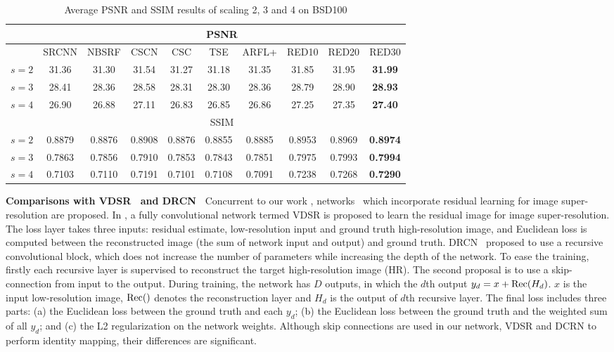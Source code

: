\begin{table*}[htb!]
\centering
%
\caption{Average PSNR and SSIM results of scaling 2, 3 and 4 on BSD100}
\begin{tabular}{c|c c c c c c c c c}  \hline
              &\multicolumn{9}{c}{PSNR}            \\ \hline
           &SRCNN  &NBSRF  &CSCN   &CSC    &TSE    &ARFL+  &RED10  &RED20   &RED30           \\ \hline
  $s = 2$  &31.36  &31.30  &31.54  &31.27  &31.18  &31.35  &31.85  &31.95   &\textbf{31.99}  \\ \hline
  $s = 3$  &28.41  &28.36  &28.58  &28.31  &28.30  &28.36  &28.79  &28.90   &\textbf{28.93}  \\ \hline
  $s = 4$  &26.90  &26.88  &27.11  &26.83  &26.85  &26.86  &27.25  &27.35   &\textbf{27.40}  \\ \hline
              &\multicolumn{9}{c}{SSIM}            \\ \hline
  $s = 2$  &0.8879 &0.8876 &0.8908 &0.8876 &0.8855 &0.8885 &0.8953 &0.8969  &\textbf{0.8974} \\ \hline
  $s = 3$  &0.7863 &0.7856 &0.7910 &0.7853 &0.7843 &0.7851 &0.7975 &0.7993  &\textbf{0.7994} \\ \hline
  $s = 4$  &0.7103 &0.7110 &0.7191 &0.7101 &0.7108 &0.7091 &0.7238 &0.7268  &\textbf{0.7290} \\ \hline
\end{tabular}
\label{table7}
\end{table*}


{\bf{Comparisons with VDSR~\cite{DBLP:journals/corr/KimLL15b}
and DRCN~\cite{DBLP:journals/corr/KimLL15a}}}
Concurrent to our work \cite{NIPS2016Mao}, networks~\cite{DBLP:journals/corr/KimLL15b,DBLP:journals/corr/KimLL15a}
which incorporate residual learning for image super-resolution are proposed.
In \cite{DBLP:journals/corr/KimLL15b}, a fully convolutional network termed  VDSR
is proposed to learn the residual image for image super-resolution.
The loss layer takes three inputs: residual estimate, low-resolution input and
ground truth high-resolution image, and Euclidean loss is computed between the
reconstructed image (the sum of network input and output) and ground truth.
DRCN~\cite{DBLP:journals/corr/KimLL15a} proposed to use a recursive convolutional block,
which does not increase the number of parameters while increasing the depth of the network.
To ease the training, firstly each recursive layer is supervised to reconstruct the
target high-resolution image (HR). The second proposal is to use a skip-connection
from input to the output. During training, the network has $D$ outputs,
in which the $d$th output $y_d = x + {\rm Rec}(H_d)$. $x$ is the input low-resolution image,
${\rm Rec}()$ denotes the reconstruction layer and $H_d$ is the output of $d$th recursive layer.
The final loss includes three parts: (a) the Euclidean loss between the ground truth and each $y_d$;
(b) the Euclidean loss between the ground truth and the weighted sum of all $y_d$; and
(c) the L2 regularization on the network weights. Although skip connections are used in our network,
VDSR and DCRN to perform identity mapping, their differences are significant.

